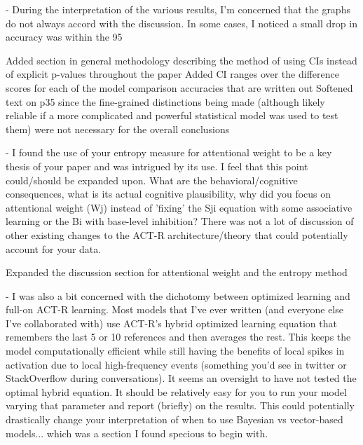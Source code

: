 \documentclass[answers,12pt]{exam}
\begin{document}
\begin{questions}
\question - During the interpretation of the various results, I'm concerned that the graphs do not always accord with the discussion. In some cases, I noticed a small drop in accuracy was within the 95%

\begin{solution}
Added section in general methodology describing the method of using CIs instead of explicit p-values throughout the paper
Added CI ranges over the difference scores for each of the model comparison accuracies that are written out
Softened text on p35 since the fine-grained distinctions being made (although likely reliable if a more complicated and powerful statistical model was used to test them) were not necessary for the overall conclusions
\end{solution}

\question - I found the use of your entropy measure for attentional weight to be a key thesis of your paper and was intrigued by its use. I feel that this point could/should be expanded upon. What are the behavioral/cognitive consequences, what is its actual cognitive plausibility, why did you focus on attentional weight (Wj) instead of 'fixing' the Sji equation with some associative learning or the Bi with base-level inhibition? There was not a lot of discussion of other existing changes to the ACT-R architecture/theory that could potentially account for your data. 

\begin{solution}
Expanded the discussion section for attentional weight and the entropy method	
\end{solution}

\question - I was also a bit concerned with the dichotomy between optimized learning and full-on ACT-R learning. Most models that I've ever written (and everyone else I've collaborated with) use ACT-R's hybrid optimized learning equation that remembers the last 5 or 10 references and then averages the rest. This keeps the model computationally efficient while still having the benefits of local spikes in activation due to local high-frequency events (something you'd see in twitter or StackOverflow during conversations). It seems an oversight to have not tested the optimal hybrid equation. It should be relatively easy for you to run your model varying that parameter and report (briefly) on the results. This could potentially drastically change your interpretation of when to use Bayesian vs vector-based models... which was a section I found specious to begin with.


\end{questions}
\end{document}
